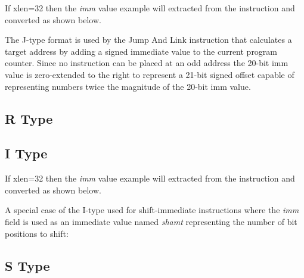 If \Gls{xlen}=32 then the {\em imm} value example will extracted from the instruction
and converted as shown below.

\label{imm.j:decode}\DrawInsnOpJTypeDecoding

%
%
%
%

The J-type format is used by the Jump And Link instruction that calculates 
a target address by adding a signed immediate value to the current program 
counter.  Since no instruction can be placed at an odd address the 20-bit 
imm value is zero-extended to the right to represent a 21-bit signed offset 
capable of representing numbers twice the magnitude of the 20-bit imm value.

\subsection{R Type}
\label{insnformat:rtype}

\subsection{I Type}
\label{insnformat:itype}

If \Gls{xlen}=32 then the {\em imm} value example will extracted from the instruction
and converted as shown below.

\label{imm.i:decode}\DrawInsnOpITypeDecoding

A special case of the I-type used for shift-immediate instructions where 
the {\em imm} field is used as an immediate value named {\em shamt} 
representing the number of bit positions to shift:

\label{shamt.i:decode}\DrawInsnOpIShiftTypeDecoding

\subsection{S Type}
\label{insnformat:stype}

